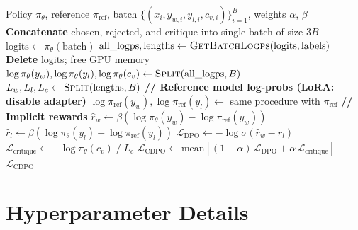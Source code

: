 \documentclass[11pt]{article}
\begin{document}
\begin{algorithm}[H]
    \caption{CDPO Training (per batch)}
    \label{alg:cdpo}
    \begin{algorithmic}[1]
        \Require Policy $\pi_\theta$, reference $\pi_{\text{ref}}$, batch $\{(x_i, y_{w,i}, y_{l,i}, c_{v,i})\}_{i=1}^{B}$, weights $\alpha$, $\beta$
        \State \textbf{Concatenate} chosen, rejected, and critique into single batch of size $3B$
        \State $\text{logits} \gets \pi_\theta(\text{batch})$
        \State $\text{all\_logps}, \text{lengths} \gets \textsc{GetBatchLogps}(\text{logits}, \text{labels})$ 
        \State \textbf{Delete} logits; free GPU memory
        \State $\log \pi_\theta(y_w), \log \pi_\theta(y_l), \log \pi_\theta(c_v) \gets \textsc{Split}(\text{all\_logps}, B)$
        \State $L_w, L_l, L_c \gets \textsc{Split}(\text{lengths}, B)$ 
        \Statex
        \State \textbf{// Reference model log-probs (LoRA: disable adapter)}
        \State $\log \pi_{\text{ref}}(y_w), \log \pi_{\text{ref}}(y_l) \gets$ same procedure with $\pi_{\text{ref}}$
        \Statex
        \State \textbf{// Implicit rewards}
        \State $\hat{r}_w \gets \beta \left(\log \pi_\theta(y_w) - \log \pi_{\text{ref}}(y_w)\right)$
        \State $\hat{r}_l \gets \beta \left(\log \pi_\theta(y_l) - \log \pi_{\text{ref}}(y_l)\right)$
        \Statex
        \State $\mathcal{L}_{\text{DPO}} \gets -\log \sigma(\hat{r}_w - \hat{r}_l)$
        \State $\mathcal{L}_{\text{critique}} \gets -\log \pi_\theta(c_v) \;/\; L_c$ 
        \State $\mathcal{L}_{\text{CDPO}} \gets \text{mean}\!\left[(1 - \alpha)\,\mathcal{L}_{\text{DPO}} + \alpha\,\mathcal{L}_{\text{critique}}\right]$
        \State \Return $\mathcal{L}_{\text{CDPO}}$
    \end{algorithmic}
\end{algorithm}

\section{Hyperparameter Details}
\label{app:hparams}
\end{document}
